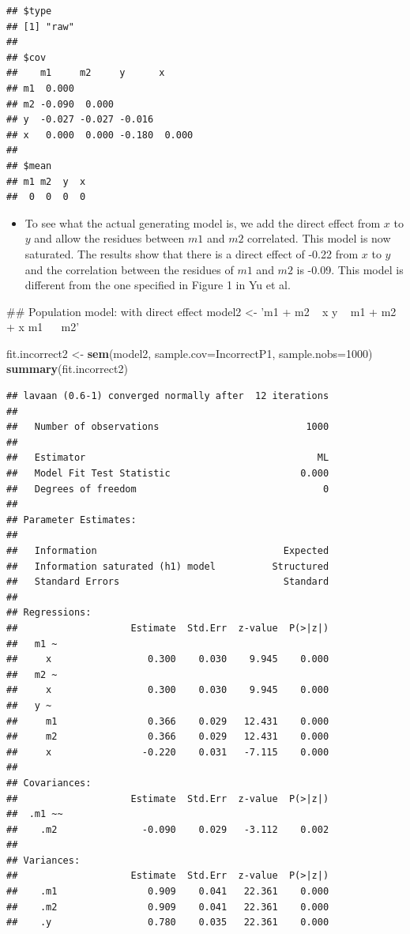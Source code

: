 \documentclass[]{article}
\newenvironment{Shaded}{\begin{snugshade}}{\end{snugshade}}
\newcommand{\KeywordTok}[1]{\textcolor[rgb]{0.13,0.29,0.53}{\textbf{#1}}}
\newcommand{\DataTypeTok}[1]{\textcolor[rgb]{0.13,0.29,0.53}{#1}}
\newcommand{\DecValTok}[1]{\textcolor[rgb]{0.00,0.00,0.81}{#1}}
\newcommand{\StringTok}[1]{\textcolor[rgb]{0.31,0.60,0.02}{#1}}
\newcommand{\NormalTok}[1]{#1}
\providecommand{\tightlist}{%
  \setlength{\itemsep}{0pt}\setlength{\parskip}{0pt}}
\begin{document}
\begin{verbatim}
## $type
## [1] "raw"
## 
## $cov
##    m1     m2     y      x     
## m1  0.000                     
## m2 -0.090  0.000              
## y  -0.027 -0.027 -0.016       
## x   0.000  0.000 -0.180  0.000
## 
## $mean
## m1 m2  y  x 
##  0  0  0  0
\end{verbatim}

\begin{itemize}
\tightlist
\item
  To see what the actual generating model is, we add the direct effect
  from \(x\) to \(y\) and allow the residues between \(m1\) and \(m2\)
  correlated. This model is now saturated. The results show that there
  is a direct effect of -0.22 from \(x\) to \(y\) and the correlation
  between the residues of \(m1\) and \(m2\) is -0.09. This model is
  different from the one specified in Figure 1 in Yu et al.
\end{itemize}

\begin{Shaded}
\begin{Highlighting}[]
\NormalTok{## Population model: with direct effect              }
\NormalTok{model2 <-}\StringTok{ 'm1 + m2 ~ x}
\StringTok{           y ~ m1 + m2 + x}
\StringTok{           m1 ~~ m2'}

\NormalTok{fit.incorrect2 <-}\StringTok{ }\KeywordTok{sem}\NormalTok{(model2, }\DataTypeTok{sample.cov=}\NormalTok{IncorrectP1, }\DataTypeTok{sample.nobs=}\DecValTok{1000}\NormalTok{)}
\KeywordTok{summary}\NormalTok{(fit.incorrect2)  }
\end{Highlighting}
\end{Shaded}

\begin{verbatim}
## lavaan (0.6-1) converged normally after  12 iterations
## 
##   Number of observations                          1000
## 
##   Estimator                                         ML
##   Model Fit Test Statistic                       0.000
##   Degrees of freedom                                 0
## 
## Parameter Estimates:
## 
##   Information                                 Expected
##   Information saturated (h1) model          Structured
##   Standard Errors                             Standard
## 
## Regressions:
##                    Estimate  Std.Err  z-value  P(>|z|)
##   m1 ~                                                
##     x                 0.300    0.030    9.945    0.000
##   m2 ~                                                
##     x                 0.300    0.030    9.945    0.000
##   y ~                                                 
##     m1                0.366    0.029   12.431    0.000
##     m2                0.366    0.029   12.431    0.000
##     x                -0.220    0.031   -7.115    0.000
## 
## Covariances:
##                    Estimate  Std.Err  z-value  P(>|z|)
##  .m1 ~~                                               
##    .m2               -0.090    0.029   -3.112    0.002
## 
## Variances:
##                    Estimate  Std.Err  z-value  P(>|z|)
##    .m1                0.909    0.041   22.361    0.000
##    .m2                0.909    0.041   22.361    0.000
##    .y                 0.780    0.035   22.361    0.000
\end{verbatim}
\end{document}
